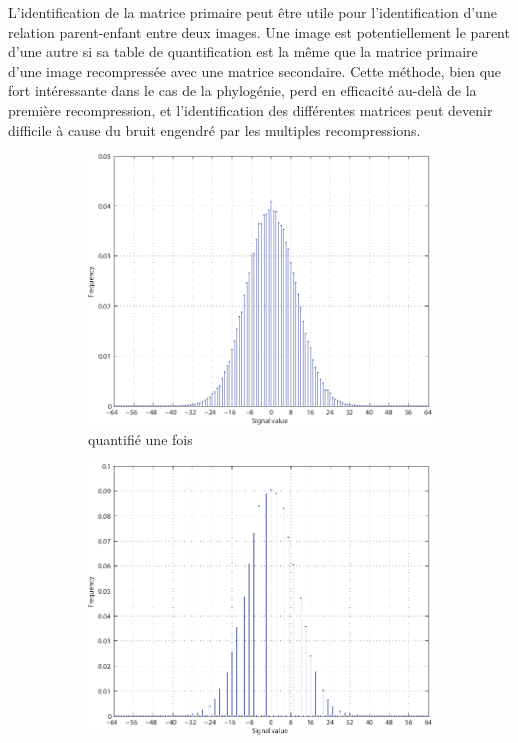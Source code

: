 \documentclass[utf8,final]{stageM2R} %
\begin{document}
L'identification de la matrice primaire peut être utile pour l'identification d'une relation parent-enfant entre deux images. Une image est potentiellement le parent d'une autre si sa table de quantification est la même que la matrice primaire d'une image recompressée avec une matrice secondaire. Cette méthode, bien que fort intéressante dans le cas de la phylogénie, perd en efficacité au-delà de la première recompression, et l'identification des différentes matrices peut devenir difficile à cause du bruit engendré par les multiples recompressions. 
\begin{figure}
  \begin{subfigure}{.33\textwidth}
    \centering
    \includegraphics[width=\linewidth]{images/h1}
    \caption{quantifié une fois}
    \label{ha}
  \end{subfigure}
  \begin{subfigure}{.33\textwidth}
    \centering
    \includegraphics[width=\linewidth]{images/h2}

\end{subfigure}
\end{figure}
\end{document}

